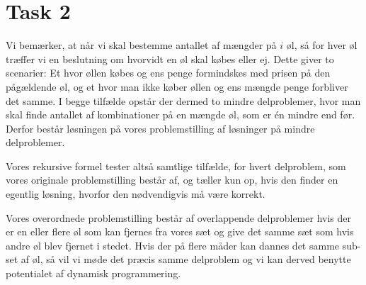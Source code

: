 \section{Task 2}

Vi bemærker, at når vi skal bestemme antallet af mængder på $i$ øl,
så for hver øl træffer vi en beslutning om hvorvidt en øl skal købes eller ej.
Dette giver to scenarier: Et hvor øllen købes og ens penge formindskes med prisen på den pågældende øl, og et hvor man ikke køber øllen og ens mængde penge forbliver det samme. I begge tilfælde opstår der dermed to mindre delproblemer,
hvor man skal finde antallet af kombinationer på en mængde øl, som er én mindre end før. Derfor består løsningen på vores problemstilling af løsninger på mindre delproblemer.

Vores rekursive formel tester altså samtlige tilfælde, for hvert delproblem, som vores originale problemstilling består af, og tæller kun op, hvis den finder en egentlig løsning, hvorfor den nødvendigvis må være korrekt.

Vores overordnede problemstilling består af overlappende delproblemer hvis der er en eller flere øl som kan fjernes fra vores sæt og give det samme sæt som hvis andre øl blev fjernet i stedet. Hvis der på flere måder kan dannes det samme sub-set af øl, så vil vi møde det præcis samme delproblem og vi kan derved benytte potentialet af dynamisk programmering.

